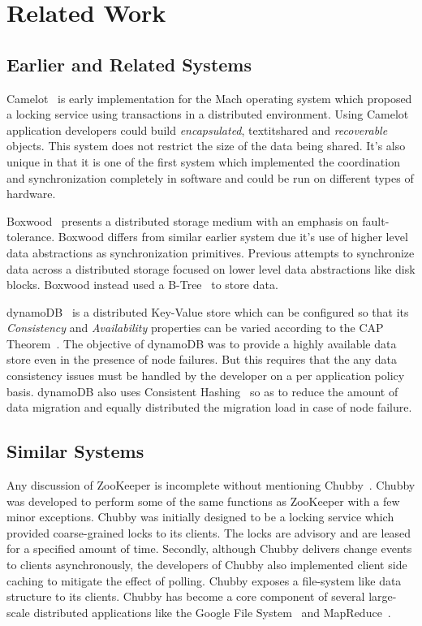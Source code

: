 \chapter{Related Work}
\section{Earlier and Related Systems}
Camelot~\cite{hastings1990distributed} is early implementation for the Mach operating system which proposed a locking service using transactions in a distributed environment. Using Camelot application developers could build \textit{encapsulated}, textit{shared} and \textit{recoverable} objects. This system does not restrict the size of the data being shared. It's also unique in that it is one of the first system which implemented the coordination and synchronization completely in software and could be run on different types of hardware.

Boxwood~\cite{maccormick2004boxwood} presents a distributed storage medium with an emphasis on fault-tolerance. Boxwood differs from similar earlier system due it's use of higher level data abstractions as synchronization primitives. Previous attempts to synchronize data across a distributed storage focused on lower level data abstractions like disk blocks. Boxwood instead used a B-Tree~\cite{skiena504algorithm} to store data.

dynamoDB~\cite{decandia2007dynamo} is a distributed Key-Value store which can be configured so that its \textit{Consistency} and \textit{Availability} properties can be varied according to the CAP Theorem~\cite{Gilbert:2002:BCF:564585.564601}. The objective of dynamoDB was to provide a highly available data store even in the presence of node failures. But this requires that the any data consistency issues must be handled by the developer on a per application policy basis. dynamoDB also uses Consistent Hashing~\cite{Karger:1997:CHR:258533.258660} so as to reduce the amount of data migration and equally distributed the migration load in case of node failure. 

\section{Similar Systems}
Any discussion of ZooKeeper is incomplete without mentioning Chubby~\cite{burrows2006chubby}. Chubby was developed to perform some of the same functions as ZooKeeper with a few minor exceptions. Chubby was initially designed to be a locking service which provided coarse-grained locks to its clients. The locks are advisory and are leased for a specified amount of time. Secondly, although Chubby delivers change events to clients asynchronously, the developers of Chubby also implemented client side caching to mitigate the effect of polling. Chubby exposes a file-system like data structure to its clients. Chubby has become a core component of several large-scale distributed applications like the Google File System~\cite{Ghemawat:2003:GFS:945445.945450} and MapReduce~\cite{Dean:2008:MSD:1327452.1327492}.

